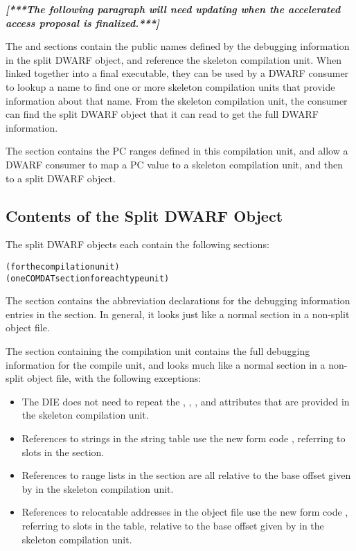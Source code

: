 \textit{\textbf{[***The following paragraph will need updating when the accelerated access
proposal is finalized.***]}}

The \dotdebugpubnames{} and \dotdebugpubtypes{}
sections contain the public names defined by the debugging
information in the split DWARF object, and reference the skeleton
compilation unit. When linked together into a final executable,
they can be used by a DWARF consumer to lookup a name to find one
or more skeleton compilation units that provide information about
that name. From the skeleton compilation unit, the consumer can
find the split DWARF object that it can read to get the full
DWARF information.

The \dotdebugaranges{} section contains the PC ranges defined in this
compilation unit, and allow a DWARF consumer to map a PC value to
a skeleton compilation unit, and then to a split DWARF object.


\subsection{Contents of the Split DWARF Object}
The split DWARF objects each contain the following sections:
\begin{alltt}
  \dotdebugabbrevdwo
  \dotdebuginfodwo{} (for the compilation unit)
  \dotdebuginfodwo{} (one COMDAT section for each type unit)
  \dotdebuglocdwo
  \dotdebuglinedwo
  \dotdebugstroffsetsdwo
  \dotdebugstrdwo
\end{alltt}
The \dotdebugabbrevdwo{} section contains the abbreviation
declarations for the debugging information entries in the
\dotdebuginfodwo{} section. In general, it looks just like a normal
\dotdebugabbrev{} section in a non-split object file.

The \dotdebuginfodwo{} section containing the compilation unit
contains the full debugging information for the compile unit, and
looks much like a normal \dotdebuginfo{} section in a non-split
object file, with the following exceptions:
\begin{itemize}
\item The \DWTAGcompileunit{} DIE does not need to repeat the
\DWATranges, \DWATlowpc, \DWAThighpc, and
\DWATstmtlist{} attributes that are provided in the skeleton
compilation unit.

\item References to strings in the string table use the new form
code \DWFORMstrx, referring to slots in the
\dotdebugstroffsetsdwo{} section.

\item References to range lists in the \dotdebugranges{} section are
all relative to the base offset given by \DWATrangesbase{}
in the skeleton compilation unit.

\item References to relocatable addresses in the object file use
the new form code \DWFORMaddrx, referring to slots in the
\dotdebugaddr{} table, relative to the base offset given by
\DWATaddrbase{} in the skeleton compilation unit.
\end{itemize}

